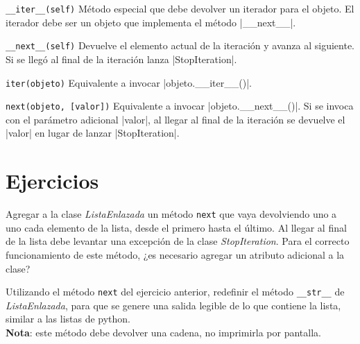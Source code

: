\begin{referencia_python}

\begin{sintaxis}{\lstinline{__iter__(self)}}
Método especial que debe devolver un iterador para el objeto. El iterador debe
ser un objeto que implementa el método |__next__|.
\end{sintaxis}

\begin{sintaxis}{\lstinline{__next__(self)}}
Devuelve el elemento actual de la iteración y avanza al siguiente.
Si se llegó al final de la iteración lanza |StopIteration|.
\end{sintaxis}

\begin{sintaxis}{\lstinline{iter(objeto)}}
Equivalente a invocar |objeto.__iter__()|.
\end{sintaxis}

\begin{sintaxis}{\lstinline{next(objeto, [valor])}}
Equivalente a invocar |objeto.__next__()|. Si se invoca con el parámetro
adicional |valor|, al llegar al final de la iteración se devuelve el |valor| en
lugar de lanzar |StopIteration|.
\end{sintaxis}
\end{referencia_python}

\newpage
\section{Ejercicios}

\begin{ejercicio}
Agregar a la clase \emph{ListaEnlazada} un método \verb!next! que vaya
devolviendo uno a uno cada elemento de la lista, desde el primero hasta el
último.  Al llegar al final de la lista debe levantar una excepción de la
clase \emph{StopIteration}.  Para el correcto funcionamiento de este método, ¿es
necesario agregar un atributo adicional a la clase?
\end{ejercicio}

\begin{ejercicio}
Utilizando el método \verb!next! del ejercicio anterior, redefinir el
método \verb!__str__! de \emph{ListaEnlazada}, para que se genere una salida
legible de lo que contiene la lista, similar a las listas de python. \\
{\bf Nota}: este método debe devolver una cadena, no imprimirla por
pantalla.
\end{ejercicio}

